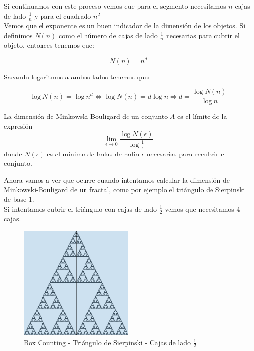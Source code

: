 \noindent Si continuamos con este proceso vemos que para el segmento necesitamos $n$ cajas de lado $\frac{1}{n}$ y para el cuadrado $n^2$\\

\noindent Vemos que el exponente es un buen indicador de la dimensión de los objetos. Si definimos $N(n)$ como el número de cajas de lado $\frac{1}{n}$ necesarias para cubrir el objeto, entonces tenemos que:

\begin{equation}
    N(n) = n^d
\end{equation}

\noindent Sacando logaritmos a ambos lados tenemos que:

\begin{equation}
    \log N(n) = \log n^d \Longleftrightarrow \log N(n) = d \log n \Longleftrightarrow d = \frac{\log N(n)}{\log n}
\end{equation}

\begin{definition}
    La dimensión de Minkowski-Bouligard de un conjunto $A$ es el límite de la expresión \cite{Wikipedia_2023}
    \begin{equation}
        \lim_{\epsilon \to 0} \frac{\log N(\epsilon)}{\log \frac{1}{\epsilon}}
    \end{equation}
    donde $N(\epsilon)$ es el mínimo de bolas de radio $\epsilon$ necesarias para recubrir el conjunto.
\end{definition}


\noindent Ahora vamos a ver que ocurre cuando intentamos calcular la dimensión de Minkowski-Bouligard de un fractal, como por ejemplo el triángulo de Sierpinski de base $1$.\\

\noindent Si intentamos cubrir el triángulo con cajas de lado $\frac{1}{2}$ vemos que necesitamos $4$ cajas.

\begin{figure}[H]
    \centering
    \includegraphics[width=0.5\textwidth]{figures/boxcounting-sierspinsky-1.png}
    \caption{Box Counting - Triángulo de Sierpinski - Cajas de lado $\frac{1}{2}$}
\end{figure}

